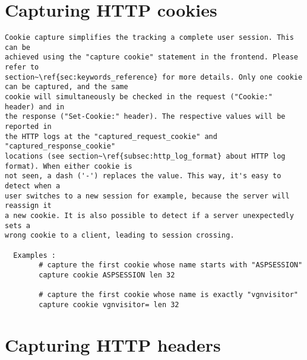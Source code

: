 \section{Capturing HTTP cookies}

\begin{verbatim}
Cookie capture simplifies the tracking a complete user session. This can be
achieved using the "capture cookie" statement in the frontend. Please refer to
section~\ref{sec:keywords_reference} for more details. Only one cookie can be captured, and the same
cookie will simultaneously be checked in the request ("Cookie:" header) and in
the response ("Set-Cookie:" header). The respective values will be reported in
the HTTP logs at the "captured_request_cookie" and "captured_response_cookie"
locations (see section~\ref{subsec:http_log_format} about HTTP log format). When either cookie is
not seen, a dash ('-') replaces the value. This way, it's easy to detect when a
user switches to a new session for example, because the server will reassign it
a new cookie. It is also possible to detect if a server unexpectedly sets a
wrong cookie to a client, leading to session crossing.

  Examples :
        # capture the first cookie whose name starts with "ASPSESSION"
        capture cookie ASPSESSION len 32

        # capture the first cookie whose name is exactly "vgnvisitor"
        capture cookie vgnvisitor= len 32
\end{verbatim}

\section{Capturing HTTP headers}

